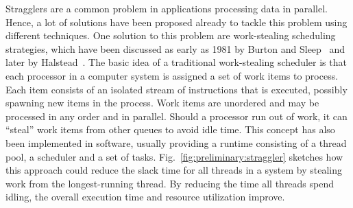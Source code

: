 Stragglers are a common problem in applications processing data in parallel.
Hence, a lot of solutions have been proposed already to tackle this problem using different techniques.
One solution to this problem are work-stealing scheduling strategies, which have been discussed as early as 1981 by Burton and Sleep~\cite{burton1981executing} and later by Halstead~\cite{halstead1984implementation}.
The basic idea of a traditional work-stealing scheduler is that each processor in a computer system is assigned a set of work items to process.
Each item consists of an isolated stream of instructions that is executed, possibly spawning new items in the process.
Work items are unordered and may be processed in any order and in parallel.
Should a processor run out of work, it can \enquote{steal} work items from other queues to avoid idle time.
This concept has also been implemented in software, usually providing a runtime consisting of a thread pool, a scheduler and a set of tasks.
Fig.~\ref{fig:preliminary:straggler} sketches how this approach could reduce the slack time for all threads in a system by stealing work from the longest-running thread.
By reducing the time all threads spend idling, the overall execution time and resource utilization improve.

